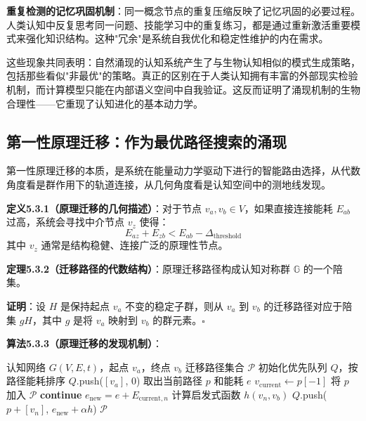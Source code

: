 \documentclass[12pt,a4paper]{article}
\newcommand{\cognitivegroup}{\mathbb{G}}
\begin{document}
\textbf{重复检测的记忆巩固机制}：同一概念节点的重复压缩反映了记忆巩固的必要过程。人类认知中反复思考同一问题、技能学习中的重复练习，都是通过重新激活重要模式来强化知识结构。这种"冗余"是系统自我优化和稳定性维护的内在需求。

这些现象共同表明：自然涌现的认知系统产生了与生物认知相似的模式生成策略，包括那些看似"非最优"的策略。真正的区别在于人类认知拥有丰富的外部现实检验机制，而计算模型只能在内部语义空间中自我验证。这反而证明了涌现机制的生物合理性——它重现了认知进化的基本动力学。

\subsection{第一性原理迁移：作为最优路径搜索的涌现}

第一性原理迁移的本质，是系统在能量动力学驱动下进行的智能路由选择，从代数角度看是群作用下的轨道连接，从几何角度看是认知空间中的测地线发现。

\textbf{定义5.3.1（原理迁移的几何描述）}：对于节点 $v_a, v_b \in V$，如果直接连接能耗 $E_{ab}$ 过高，系统会寻找中介节点 $v_z$ 使得：
\begin{equation}
E_{az} + E_{zb} < E_{ab} - \Delta_{\text{threshold}}
\end{equation}
其中 $v_z$ 通常是结构稳健、连接广泛的原理性节点。

\textbf{定理5.3.2（迁移路径的代数结构）}：原理迁移路径构成认知对称群 $\cognitivegroup$ 的一个陪集。

\textbf{证明}：设 $H$ 是保持起点 $v_a$ 不变的稳定子群，则从 $v_a$ 到 $v_b$ 的迁移路径对应于陪集 $gH$，其中 $g$ 是将 $v_a$ 映射到 $v_b$ 的群元素。$\square$

\textbf{算法5.3.3（原理迁移的发现机制）}：
\begin{algorithm}
\caption{原理迁移的发现机制}
\begin{algorithmic}[1]
\Require 认知网络 $G(V,E,t)$，起点 $v_a$，终点 $v_b$
\Ensure 迁移路径集合 $\mathcal{P}$
\State 初始化优先队列 $Q$，按路径能耗排序
\State $Q$.push($[v_a]$, $0$) 
    \State 取出当前路径 $p$ 和能耗 $e$
    \State $v_{\text{current}} \gets p[-1]$ 
        \State 将 $p$ 加入 $\mathcal{P}$
        \State \textbf{continue}
    \EndIf
         
            \State $e_{\text{new}} = e + E_{\text{current},n}$
            \State 计算启发式函数 $h(v_n, v_b)$
            \State $Q$.push($p + [v_n]$, $e_{\text{new}} + \alpha h$)
        \EndIf
    \EndFor
\EndWhile
\State \Return $\mathcal{P}$
\end{algorithmic}
\end{algorithm}
\end{document}
